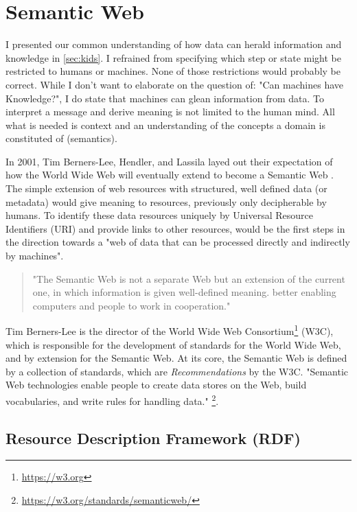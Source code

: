 \documentclass[a4paper,english,twoside,BCOR1.5cm,headsepline,DIV12,appendixprefix,final,12pt]{scrbook}
\newcommand\footnoteurl[1]{\footnote{\scriptsize\url{#1}}}
\begin{document}
\pagebreak
\section{Semantic Web}
\label{sec:semweb}

I presented our common understanding of how data can herald information and knowledge in \cref{sec:kids}. I refrained from specifying which step or state might be restricted to humans or machines. None of those restrictions would probably be correct. While I don't want to elaborate on the question of: "Can machines have Knowledge?", I do state that machines can glean information from data. To interpret a message and derive meaning is not limited to the human mind. All what is needed is context and an understanding of the concepts a domain is constituted of (semantics).

In 2001, Tim Berners-Lee, Hendler, and Lassila layed out their expectation of how the World Wide Web will eventually extend to become a Semantic Web \cite{Semweb1}. The simple extension of web resources with structured, well defined data (or metadata) would give meaning to resources, previously only decipherable by humans. To identify these data resources uniquely by Universal Resource Identifiers (URI) and provide links to other resources, would be the first steps in the direction towards a "web of data that can be processed directly and indirectly by machines". 

\begin{quote}
"The Semantic Web is not a separate Web but an extension of the current one, in which information is given well-defined meaning. better enabling
computers and people to work in cooperation." \cite{Semweb1}
\end{quote}

Tim Berners-Lee is the director of the World Wide Web Consortium\footnoteurl{https://w3.org} (W3C), which is responsible for the development of standards for the World Wide Web, and by extension for the Semantic Web. At its core, the Semantic Web is defined by a collection of standards, which are \textit{Recommendations} by the W3C. "Semantic Web technologies enable people to create data stores on the Web, build vocabularies, and write rules for handling data." \footnoteurl{https://w3.org/standards/semanticweb/}.

\subsection{Resource Description Framework (RDF)}
\label{sec:rdf}
\end{document}
